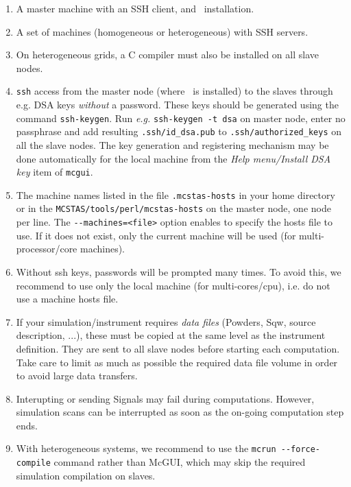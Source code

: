   \begin{enumerate}
  \item{A master machine with an SSH client, and \MCS\ installation.}
  \item{A set of machines (homogeneous or heterogeneous) with SSH servers.}
  \item{On heterogeneous grids, a C compiler must also be installed on all slave nodes.}
  \item{\texttt{ssh} access from the master node (where \MCS\ is
      installed) to the slaves through e.g. DSA keys \emph{without} a
      password. These keys should be generated using the command
      \texttt{ssh-keygen}. Run \emph{e.g.} \texttt{ssh-keygen -t dsa} on
      master node, enter no passphrase and add resulting
      \texttt{.ssh/id\_dsa.pub} to \texttt{.ssh/authorized\_keys}
      on all the slave nodes. The key generation and registering mechanism 
      may be done automatically for the local machine from the 
      \emph{Help menu/Install DSA key} item of \verb+mcgui+.}
  \item{The machine names listed in the file \texttt{.mcstas-hosts} in
      your home directory or in the \texttt{MCSTAS/tools/perl/mcstas-hosts} on
      the master node, one node per line. The \verb'--machines=<file>' option
      enables to specify the hosts file to use. If it does not exist, only 
      the current machine will be used (for multi-processor/core machines).}
  \item{Without ssh keys, passwords will be prompted many times. To avoid this, 
      we recommend to use only the local machine (for multi-cores/cpu), i.e. do
      not use a machine hosts file.}
  \item{If your simulation/instrument requires \emph{data files} (Powders, Sqw, source 
      description, ...), these must be copied at the same level as the instrument 
      definition. They are sent to all slave nodes before starting each computation.
      Take care to limit as much as possible the required data file volume in order
      to avoid large data transfers.}
  \item Interupting or sending Signals may fail during computations. However, 
  simulation scans can be interrupted as soon as the on-going computation 
  step ends.
  \item With heterogeneous systems, we recommend to use the \verb+mcrun --force-compile+ 
    command rather than McGUI, which may skip the required simulation compilation
    on slaves.
  \end{enumerate}

